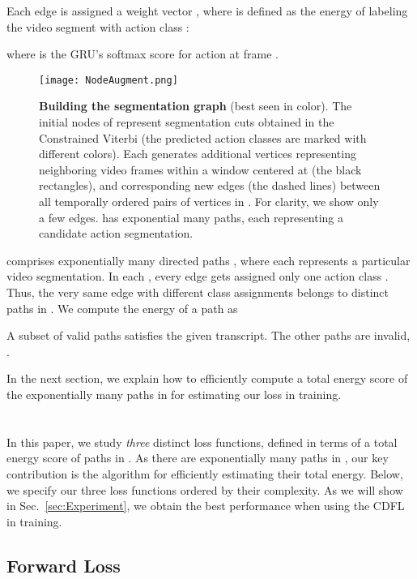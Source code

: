\documentclass[10pt,twocolumn,letterpaper]{article}
\begin{document}
Each edge  is assigned a weight vector  , where   is defined as the energy of labeling the video segment   with action class :

where  is the GRU's softmax score for action  at frame .



\begin{figure}
\centering
\texttt{[image: NodeAugment.png]}
\caption{{\bf Building the segmentation graph}  (best seen in color). The initial nodes of  represent segmentation cuts  obtained in the Constrained Viterbi (the predicted action classes are marked with different colors). Each  generates additional vertices  representing neighboring video frames within a window  centered at  (the black rectangles), and corresponding new edges  (the dashed lines) between all temporally ordered pairs of vertices in . For clarity, we show only a few edges.  has exponential many  paths, each representing a candidate action segmentation.}
\label{fig:NodeAugment}
\end{figure}

 comprises exponentially many directed paths , where each  represents a particular video segmentation. In each , every edge  gets assigned only one action class . Thus, the very same edge with  different class assignments belongs to  distinct paths in . We compute the energy of a path as


A subset of valid paths  satisfies the given transcript. The other paths are invalid, .

In the next section, we explain how to efficiently compute a total energy score of the exponentially many paths in  for estimating our loss in training.




\section{\model}\label{sec:CDFL}

In this paper, we study {\em three} distinct loss functions, defined in terms of a total energy score of paths in . As there are exponentially many paths in , our key contribution is the algorithm for efficiently estimating their total energy.  Below, we specify our three loss functions ordered by their complexity. As we will show in Sec.~\ref{sec:Experiment}, we obtain the best performance when using the CDFL in training.


\subsection{Forward Loss}
\end{document}
